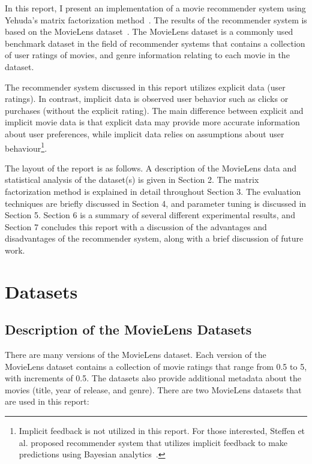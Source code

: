 \documentclass{article}
\begin{document}
In this report, I present an implementation of a movie recommender system using Yehuda's matrix
factorization method~\cite{Yehuda}. The results of the recommender system is based on 
the MovieLens dataset~\cite{MovieLens}. The MovieLens dataset is a commonly used benchmark
dataset in the field of recommender systems that contains a collection of user ratings of movies, and genre
information relating to each movie in the dataset.

The recommender system discussed in this report utilizes explicit data (user ratings).
In contrast, implicit data is observed user behavior such as clicks or purchases (without the explicit rating).
The main difference between explicit and implicit movie data is that explicit data may provide more accurate information
about user preferences, while implicit data relies on assumptions about user behaviour\footnote{Implicit feedback is not utilized in this report. 
For those interested, Steffen et al. proposed recommender system that utilizes implicit feedback to make predictions using 
Bayesian analytics~\cite{BPR}.}.

The layout of the report is as follows. A description of the MovieLens data and statistical analysis of the dataset(s)
is given in Section 2. The matrix factorization method is explained in detail throughout Section 3.
The evaluation techniques are briefly discussed in Section 4, and parameter tuning is discussed in Section 5.
Section 6 is a summary of several different experimental results, and Section 7 concludes this report with
a discussion of the advantages and disadvantages of the recommender system, along with a brief discussion of future work.

\newpage

\section{Datasets}

\subsection{Description of the MovieLens Datasets}
There are many versions of the MovieLens dataset.
Each version of the MovieLens dataset contains a collection of movie ratings that range from 0.5 to 5, with increments of 0.5.
The datasets also provide additional metadata about the movies (title, year of release, and genre).
There are two MovieLens datasets that are used in this report:
\end{document}
